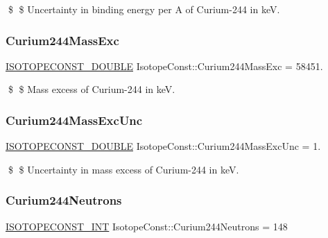 \$ \$ Uncertainty in binding energy per A of Curium-\/244 in keV. \mbox{\label{group___isotope_const-_curium-_cm244_ga822d2886d1b182b43ed9b9fb29589bf2}} 
\subsubsection{\texorpdfstring{Curium244\+Mass\+Exc}{Curium244MassExc}}
{\footnotesize\ttfamily \mbox{\hyperlink{group___isotope_const-_macros_ga8f45a7272ce02c0b4c65c44636ed719a}{I\+S\+O\+T\+O\+P\+E\+C\+O\+N\+S\+T\+\_\+\+D\+O\+U\+B\+LE}} Isotope\+Const\+::\+Curium244\+Mass\+Exc = 58451.}

\$ \$ Mass excess of Curium-\/244 in keV. \mbox{\label{group___isotope_const-_curium-_cm244_gaed4f263b939aa52ced9a2a00c71fde1c}} 
\subsubsection{\texorpdfstring{Curium244\+Mass\+Exc\+Unc}{Curium244MassExcUnc}}
{\footnotesize\ttfamily \mbox{\hyperlink{group___isotope_const-_macros_ga8f45a7272ce02c0b4c65c44636ed719a}{I\+S\+O\+T\+O\+P\+E\+C\+O\+N\+S\+T\+\_\+\+D\+O\+U\+B\+LE}} Isotope\+Const\+::\+Curium244\+Mass\+Exc\+Unc = 1.}

\$ \$ Uncertainty in mass excess of Curium-\/244 in keV. \mbox{\label{group___isotope_const-_curium-_cm244_ga37e3292c6437b179f1ad5e6a0d2c1367}} 
\subsubsection{\texorpdfstring{Curium244\+Neutrons}{Curium244Neutrons}}
{\footnotesize\ttfamily \mbox{\hyperlink{group___isotope_const-_macros_ga5f18360b3e99483a35c32d789e62621c}{I\+S\+O\+T\+O\+P\+E\+C\+O\+N\+S\+T\+\_\+\+I\+NT}} Isotope\+Const\+::\+Curium244\+Neutrons = 148}

